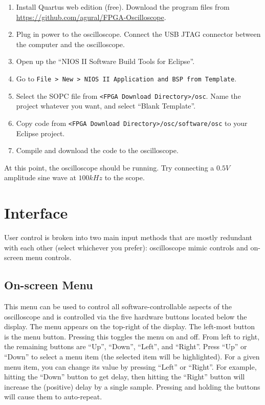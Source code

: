 \begin{enumerate}
	\item Install Quartus web edition (free). Download the program files from \url{https://github.com/agural/FPGA-Oscilloscope}.
	\item Plug in power to the oscilloscope. Connect the USB JTAG connector between the computer and the oscilloscope.
	\item Open up the ``NIOS II Software Build Tools for Eclipse''.
	\item Go to \verb|File > New > NIOS II Application and BSP from Template|.
	\item Select the SOPC file from \verb|<FPGA Download Directory>/osc|. Name the project whatever you want, and select ``Blank Template''.
	\item Copy code from \verb|<FPGA Download Directory>/osc/software/osc| to your Eclipse project.
	\item Compile and download the code to the oscilloscope.
\end{enumerate}

At this point, the oscilloscope should be running. Try connecting a $0.5V$ amplitude sine wave at $100kHz$ to the scope.

\section{Interface}

User control is broken into two main input methods that are mostly redundant with each other (select whichever you prefer): oscilloscope mimic controls and on-screen menu controls.

\subsection{On-screen Menu}
This menu can be used to control all software-controllable aspects of the oscilloscope and is controlled via the five hardware buttons located below the display. The menu appears on the top-right of the display. The left-most button is the menu button. Pressing this toggles the menu on and off. From left to right, the remaining buttons are ``Up'', ``Down'', ``Left'', and ``Right''. Press ``Up'' or ``Down'' to select a menu item (the selected item will be highlighted). For a given menu item, you can change its value by pressing ``Left'' or ``Right''. For example, hitting the ``Down'' button to get delay, then hitting the ``Right'' button will increase the (positive) delay by a single sample. Pressing and holding the buttons will cause them to auto-repeat.


